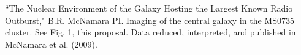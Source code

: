 \documentclass[12pt]{article}
\begin{document}

%
%
\specialreq             %


%
%
\coordinatedobs          %


%
%
\duplications           %



%
%
\pasthstusage  %
``The Nuclear Environment of the Galaxy Hosting the Largest Known Radio Outburst," B.R. McNamara PI.  Imaging of the central galaxy in the MS0735
cluster.  See Fig. 1, this proposal.  Data reduced, interpreted, and published in McNamara et al. (2009).
\end{document}
